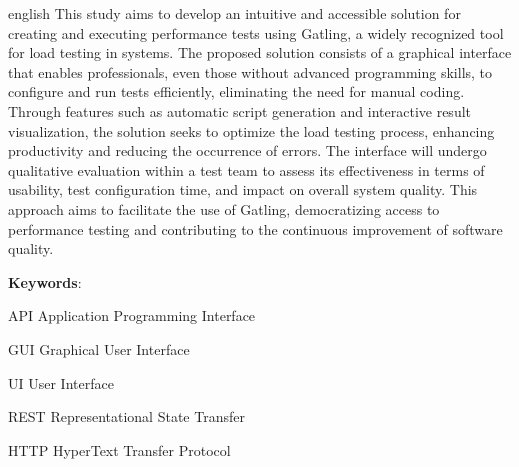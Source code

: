 \documentclass[
	12pt,
	openright,
	twoside,
	a4paper,
	english,
	brazil
	]{abntex2}
\begin{document}
\begin{resumo}[Abstract]
  \begin{otherlanguage*}{english}
    This study aims to develop an intuitive and accessible solution for creating and executing performance tests using Gatling, a widely recognized tool for load testing in systems. The proposed solution consists of a graphical interface that enables professionals, even those without advanced programming skills, to configure and run tests efficiently, eliminating the need for manual coding. Through features such as automatic script generation and interactive result visualization, the solution seeks to optimize the load testing process, enhancing productivity and reducing the occurrence of errors. The interface will undergo qualitative evaluation within a test team to assess its effectiveness in terms of usability, test configuration time, and impact on overall system quality. This approach aims to facilitate the use of Gatling, democratizing access to performance testing and contributing to the continuous improvement of software quality.
    \vspace{\onelineskip}

    \noindent\textbf{Keywords}: %
  \end{otherlanguage*}
\end{resumo}


\listoffigures*
\cleardoublepage




\listoftables*
\cleardoublepage


\begin{siglas}
  \item[API] Application Programming Interface
  \item[GUI] Graphical User Interface
  \item[UI] User Interface
  \item[REST] Representational State Transfer
  \item[HTTP] HyperText Transfer Protocol
\end{siglas}
\end{document}
